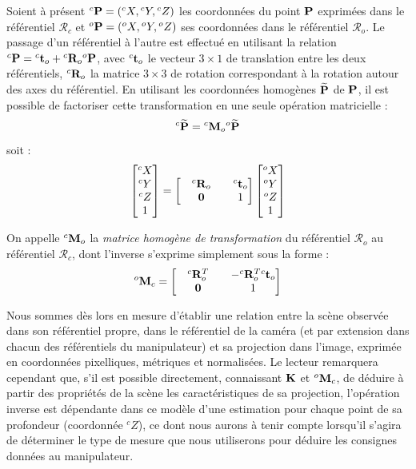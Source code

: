 Soient \`a pr\'esent ${}^c{\bf P} = ({}^cX, {}^cY, {}^cZ)$ les coordonnées du point ${\bf P}$ 
exprimées dans le référentiel $\mathcal R_c$ et ${}^o{\bf P} = ({}^oX, {}^oY, 
{}^oZ)$ ses coordonnées dans le référentiel $\mathcal R_o$. Le passage d'un 
référentiel à l'autre est effectué en utilisant la relation ${}^c{\bf P} = 
{}^c{\bf t}_o + {}^c{\bf R}_o {}^o{\bf P}$, avec ${}^c{\bf t}_o$ le vecteur 
$3\times 1$ de translation entre les deux référentiels, ${}^c{\bf R}_o$ la 
matrice $3\times 3$ de rotation correspondant à la rotation autour des axes du 
référentiel. En utilisant les coordonnées homogènes $\widetilde {\bf P}$ de 
${\bf P}$, il est possible de factoriser cette transformation en une seule 
opération matricielle :
\begin{equation}
{}^c \widetilde {\bf P} = {}^c {\bf M}_o {}^o \widetilde {\bf P}
\label{intro:eq18}
\end{equation}
soit :
\begin{equation}
\begin{bmatrix}
{}^cX \\ {}^cY \\ {}^cZ \\ 1
\end{bmatrix}
=
\begin{bmatrix}
&  {}^c{\bf R}_o & & {}^c{\bf t}_o \\
& {\bf 0} & & 1
\end{bmatrix}
\begin{bmatrix}
{}^oX \\ {}^oY \\ {}^oZ \\ 1
\end{bmatrix}
\label{intro:eq19}
\end{equation}

On appelle ${}^c{\bf M}_o$ la {\it matrice homogène de transformation} du 
référentiel $\mathcal R_o$ au référentiel $\mathcal R_c$, dont l'inverse 
s'exprime simplement sous la forme :
\begin{equation}
{}^o{\bf M}_c = 
\begin{bmatrix}
&  {}^c{\bf R}_o^T & & -{}^c{\bf R}_o^T {}^c{\bf t}_o \\
& {\bf 0} & & 1
\end{bmatrix}
\label{intro:eq20}
\end{equation}

Nous sommes dès lors en mesure d'établir une relation entre la scène observée 
dans son référentiel propre, dans le r\'ef\'erentiel de la cam\'era (et par extension dans chacun des r\'ef\'erentiels du manipulateur) et sa projection dans l'image, exprimée en coordonnées pixelliques, métriques et normalisées. Le lecteur 
remarquera cependant que, s'il est possible directement, connaissant ${\bf K}$ 
et ${}^o{\bf M}_c$, de déduire à partir des propriétés de la scène les 
caractéristiques de sa projection, l'opération inverse est dépendante dans ce 
modèle d'une estimation pour chaque point de sa profondeur (coordonnée ${}^cZ$), ce dont nous aurons \`a tenir compte lorsqu'il s'agira de d\'eterminer le type de mesure que nous utiliserons pour d\'eduire les consignes donn\'ees au manipulateur.


